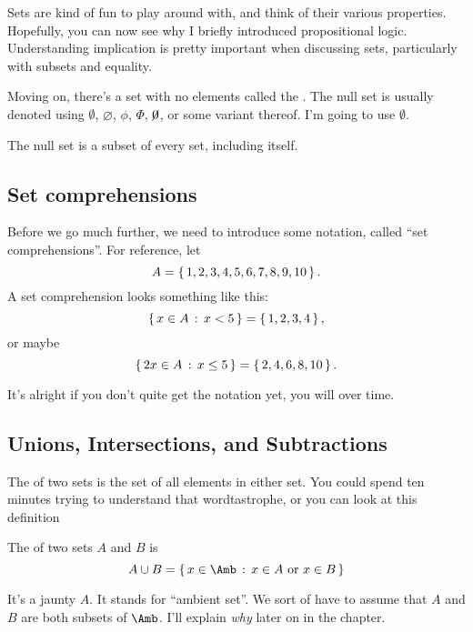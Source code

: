 \begin{aside}
  Sets are kind of fun to play around with, and think of their various
  properties. Hopefully, you can now see why I briefly introduced
  propositional logic. Understanding implication is pretty important
  when discussing sets, particularly with subsets and equality.
\end{aside}

Moving on, there's a set with no elements called the . The null set is usually denoted using $\emptyset$,
$\varnothing$, $\phi$, $\Phi$, $\centernot 0$, or some variant
thereof. I'm going to use $\emptyset$.

\begin{lemma}
  The null set is a subset of every set, including itself.
\end{lemma}

\subsection{Set comprehensions}

Before we go much further, we need to introduce some notation, called
``set comprehensions''. For reference, let
$$A = \left\{ \, 1,2,3,4,5,6,7,8,9,10 \, \right\}.$$ A set comprehension looks
something like this: $$\left\{ \,  x \in A \, : \, x < 5  \, \right\} = \left\{ \, 1,2,3,4 \, \right\},$$ or
maybe $$\left\{ \,  2x \in A \, : \, x \le 5  \, \right\} = \left\{ \, 2,4,6,8,10 \, \right\}.$$


It's alright if you don't quite get the notation yet, you will over
time.

\subsection{Unions, Intersections, and Subtractions}

 The  of
two sets is the set of all elements in either set. You could spend ten
minutes trying to understand that wordtastrophe, or you can look at
this definition

\begin{definition}
  The  of two sets $A$ and $B$ is $$A \cup B = \scomp{x
    \in \Amb}{x \in A \tor x \in B}$$
\end{definition}


It's a jaunty $A$. It stands for ``ambient set''. We sort of have to
assume that $A$ and $B$ are both subsets of $\Amb$. I'll explain
\emph{why} later on in the chapter.

